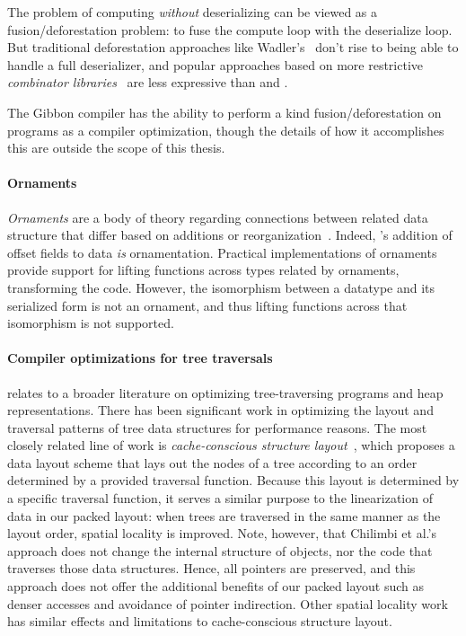 The problem of computing \emph{without} deserializing can be viewed as a
fusion/deforestation problem: to fuse the compute loop with the deserialize
loop. But traditional deforestation approaches like
Wadler's~\cite{wadler-deforestation} don't rise to being able to handle a full
deserializer, and popular approaches based on more restrictive \emph{combinator
libraries}~\cite{stream-fusion} are less expressive than \lamadt{} and
\ourcalc{}.

The Gibbon compiler has the ability to perform a kind fusion/deforestation on
\lamadt{} programs as a compiler optimization, though the details of how it
accomplishes this are outside the scope of this thesis.

\paragraph{Ornaments}

\emph{Ornaments} are a body of theory regarding connections between related
data structure that differ based on additions or
reorganization~\cite{ornaments}.
%
Indeed, \ourcalc's addition of offset fields to data \emph{is} ornamentation.
%
Practical implementations of ornaments~\cite{ornament-ml} provide support for
lifting functions across types related by ornaments, transforming the code.
%
However, the isomorphism between a datatype and its serialized form is not an
ornament, and thus lifting functions across that isomorphism is not supported.


\paragraph{Compiler optimizations for tree traversals}

\ourcalc{} relates to a broader literature on optimizing
tree-traversing programs and heap representations.
%
There has been significant work in optimizing the layout and
traversal patterns of tree data structures for performance reasons.
%
The most closely related line of work is \emph{cache-conscious structure
  layout}~\cite{chilimbi1999}, which proposes a data layout scheme that lays out
the nodes of a tree according to an order determined by a provided traversal
function. Because this layout is determined by a specific traversal function,
it serves a similar purpose to the linearization of data in our packed layout:
when trees are traversed in the same manner as the layout order, spatial
locality is improved. Note, however, that Chilimbi et al.'s approach does not
change the internal structure of objects, nor the code that traverses those
data structures. Hence, all pointers are preserved, and this approach does not
offer the additional benefits of our packed layout such as denser accesses and
avoidance of pointer indirection. Other spatial locality
work~\cite{Truong1998,Lattner2005,Chilimbi1999a} has similar effects and
limitations to cache-conscious structure layout.

